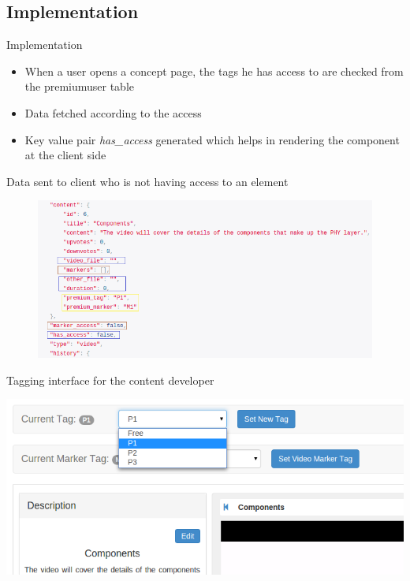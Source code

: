 \documentclass{beamer}
\begin{document}
\subsection{Implementation}

\begin{frame}{Implementation}
	\begin{itemize}
		\item When a user opens a concept page, the tags he has access to are checked from the premiumuser table
		\item Data fetched according to the access
		\item Key value pair \textit{has\_access} generated which helps in rendering the component at the client side
	\end{itemize}
\end{frame}

\begin{frame}{Data sent to client who is not having access to an element}	
	\begin{figure}
	\centering
	\includegraphics[width=1\linewidth]{media/SUgetdata}
	\label{fig:SUgetdata}
	\end{figure}
\end{frame}

\begin{frame}{Tagging interface for the content developer}
	\begin{center}
		\includegraphics[width=1\linewidth]{media/tagging_interface}
	\end{center}
\end{frame}
\end{document}
